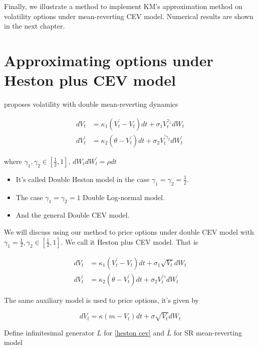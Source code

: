 Finally, we illustrate a method to implement KM's approximation method on volatility options under mean-reverting CEV model. Numerical results are shown in the next chapter.

\section{Approximating options under Heston plus CEV model}\label{sec: 3.2}

\cite{gatheral_consistent_2008} proposes volatility with double mean-reverting dynamics

$$
    \begin{aligned}
        d V_t &=\kappa_1 \left(V^{\prime}_t - V_t\right) d t+\sigma_{1} V^{\gamma_1}_t d W_t \\
        d V^{\prime}_t &=\kappa_2\left(\theta -V^{\prime}_t\right) d t+\sigma_{2} V^{\prime \gamma_2}_t d W^{\prime}_t
    \end{aligned}
$$

\noindent where $\gamma_1, \gamma_2 \in [\frac{1}{2},1]$, $dW_t dW^{\prime}_t = \rho dt$

\begin{itemize}
    \item It's called Double Heston model in the case $\gamma_1=\gamma_2=\frac{1}{2}$.
    \item The case $\gamma_1=\gamma_2=1$ Double Log-normal model.
    \item And the general Double CEV model.
\end{itemize}

We will discuss using our method to price options under double CEV model with $\gamma_1 = \frac{1}{2}, \gamma_2 \in [\frac{1}{2}, 1]$. We call it Heston plus CEV model. That is

$$
\begin{aligned}\label{heston cev}
    d V_t &=\kappa_1 \left(V^{\prime}_t - V_t\right) d t+\sigma_{1} \sqrt{V_t} d W_t \\
    d V^{\prime}_t &=\kappa_2\left(\theta -V^{\prime}_t\right) d t+\sigma_{2} V^{\prime \gamma}_t d W^{\prime}_t
\end{aligned}
$$

The same auxiliary model is used to price options, it's given by

$$
d V_t=\kappa(m - V_t) d t+\sigma \sqrt{V_t} d W_t
$$

\noindent Define infinitesimal generator $L$ for \eqref{heston cev} and $\bar{L}$ for SR mean-reverting model

